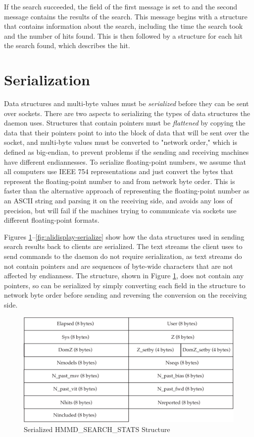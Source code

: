 \documentclass[notoc,justified]{tufte-book}    %
\begin{document}
If the search succeeded, the  field of the first message is set to  and the second message contains the results of the search.  This message begins with a  structure that contains information about the search, including the time the search took and the number of hits found.  This is then followed by a  structure for each hit the search found, which describes the hit.

\section{Serialization}
Data structures and multi-byte values must be {\em serialized} before they can be sent over sockets.  There are two aspects to serializing the types of data structures the daemon uses.  Structures that contain pointers must be {\em flattened} by copying the data that their pointers point to into the block of data that will be sent over the socket, and multi-byte values must be converted to "network order," which is defined as big-endian, to prevent problems if the sending and receiving machines have different endiannesses.  To serialize floating-point numbers, we assume that all computers use IEEE 754 representations and just convert the bytes that represent the floating-point number to and from network byte order.  This is faster than the alternative approach of representing the floating-point number as an ASCII string and parsing it on the receiving side, and avoids any loss of precision, but will fail if the machines trying to communicate via sockets use different floating-point formats.  

Figures \ref{fig:search-stats-serialize}--\ref{fig:alidisplay-serialize} show how the data structures used in sending search results back to clients are serialized.  The text streams the client uses to send commands to the daemon do not require serialization, as text streams do not contain pointers and are sequences of byte-wide characters that are not affected by endianness.  The  structure, shown in Figure \ref{fig:search-stats-serialize}, does not contain any pointers, so can be serialized by simply converting each field in the structure to network byte order before sending and reversing the conversion on the receiving side.  

\begin{figure}
\includegraphics[width=\textwidth]{inclusions/hmmpgmd-search-stats-serialize.pdf}
\caption{Serialized {HMMD\_SEARCH\_STATS} Structure}
\label{fig:search-stats-serialize}
\end{figure} 
\end{document}
